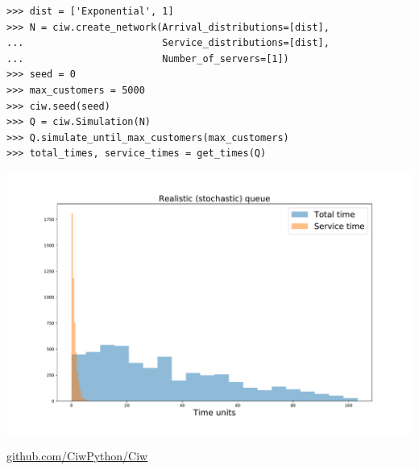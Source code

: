 \documentclass{beamer}
\begin{document}
    \begin{frame}[fragile]{}
        \begin{verbatim}
>>> dist = ['Exponential', 1]
>>> N = ciw.create_network(Arrival_distributions=[dist],
...                        Service_distributions=[dist],
...                        Number_of_servers=[1])
>>> seed = 0
>>> max_customers = 5000
>>> ciw.seed(seed)
>>> Q = ciw.Simulation(N)
>>> Q.simulate_until_max_customers(max_customers)
>>> total_times, service_times = get_times(Q)

        \end{verbatim}
\end{frame}

\begin{frame}
    \begin{center}
        \includegraphics[width=\textwidth]{assets/stochastic_queue.pdf}

        \pause
        \Large
            \href{https://github.com/CiwPython/Ciw}
            {github.com/CiwPython/Ciw}
    \end{center}
\end{frame}
\end{document}
